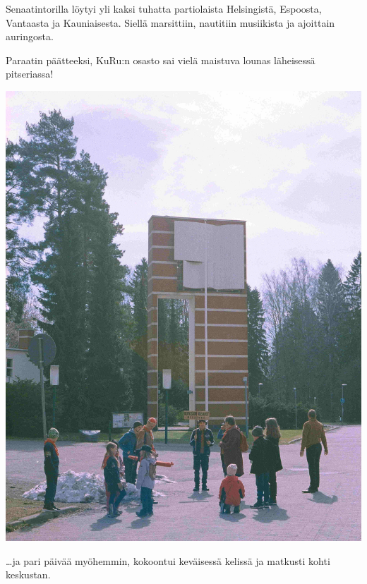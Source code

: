 \documentclass[10pt,finnish,a5paper,headings=small,twoside=semi]{scrartcl}
\begin{document}
\begin{multicols}{2}
	\vspace*{-0.32cm}
	\small Senaatintorilla löytyi yli kaksi tuhatta partiolaista Helsingistä, Espoosta, Vantaasta ja Kauniaisesta. Siellä marsittiin, nautitiin musiikista ja ajoittain auringosta.

	Paraatin päätteeksi, KuRu:n osasto sai vielä maistuva lounas läheisessä \mbox{pitseriassa}!

	\columnbreak

	\begin{center}
		\noindent\includegraphics[width=0.9\linewidth]{assets/paraati2}
	\end{center}

	\vspace*{-0.32cm}
	\ldots ja pari päivää myöhemmin, kokoontui keväisessä kelissä ja matkusti kohti keskustan.


\end{multicols}
\end{document}
